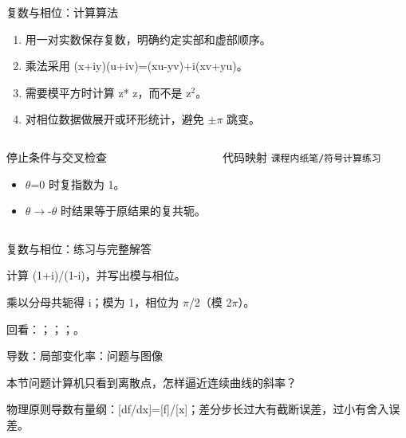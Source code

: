 \begin{frame}[t]{复数与相位：计算算法}
\footnotesize
{}\begin{enumerate}
\item 用一对实数保存复数，明确约定实部和虚部顺序。
\item 乘法采用 (x+iy)(u+iv)=(xu-yv)+i(xv+yu)。
\item 需要模平方时计算 z* z，而不是 z\ensuremath{^{2}}。
\item 对相位数据做展开或环形统计，避免 \ensuremath{\pm}\ensuremath{\pi} 跳变。
\end{enumerate}\begin{columns}[T,onlytextwidth]
\begin{block}{停止条件与交叉检查}\scriptsize\begin{itemize}
\item[\CheckMark] \ensuremath{\theta}=0 时复指数为 1。
\item[\CheckMark] \ensuremath{\theta}\ensuremath{\rightarrow}-\ensuremath{\theta} 时结果等于原结果的复共轭。
\end{itemize}\end{block}
\begin{block}{代码映射}
\scriptsize \texttt{课程内纸笔/\allowbreak{}符号计算练习}
\end{block}\end{columns}\end{frame}

\begin{frame}[t]{复数与相位：练习与完整解答}
\footnotesize
\begin{block}{}计算 (1+i)/\allowbreak{}(1-i)，并写出模与相位。\end{block}
\begin{exampleblock}{}乘以分母共轭得 i；模为 1，相位为 \ensuremath{\pi}/\allowbreak{}2（模 2\ensuremath{\pi}）。\end{exampleblock}
\vfill
\scriptsize 回看：；；；。
\end{frame}

\begin{frame}[t]{导数：局部变化率：问题与图像}
\footnotesize
\begin{block}{本节问题}计算机只看到离散点，怎样逼近连续曲线的斜率？\end{block}
\begin{block}{物理原则}\quad 导数有量纲：[df/\allowbreak{}dx]=[f]/\allowbreak{}[x]；差分步长过大有截断误差，过小有舍入误差。\end{block}
\end{frame}

